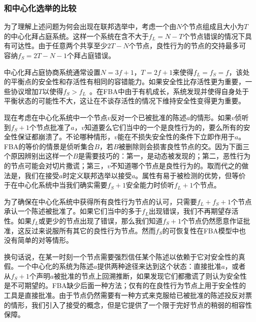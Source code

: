 \subsubsection{和中心化选举的比较}

为了理解上述问题为何会出现在联邦选举中，考虑一个由$N$个节点组成且{\quorum}大小为$T$的中心化拜占庭系统。这样一个系统在含不大于$f_L=N-T$个节点错误的情况下具有{\quorum}可达性。由于任意两个{\quorum}共享至少$2T-N$个节点，良性行为的节点的{\quorum}交持最多可容纳$f_S=2T-N-1$个拜占庭错误。

中心化拜占庭协商系统通常设置$N=3f+1$，$T=2f+1$来使得$f_L=f_S=f$，该处的平衡点的安全性和存活性有相同的容错能力。如果安全性比存活性更为重要，一些协议增加$T$以使得$f_S>f_L$~\cite{Li:2007:BOF:1973430.1973440}。在FBA中由于{\quorum}有机成长，系统发现并使得自身处于平衡状态的可能性不大，这让在不谈存活性的情况下维持安全性变得更为重要。

现在考虑在中心化系统中一个节点$v$反对一个已被批准的陈述$a$的情形。如果$v$侦听到$f_S+1$个节点批准了$a$，$v$知道要么它们当中的一个是良性行为的，要么所有的安全性保证都崩溃了。不论哪种情形，$v$能在不损失安全性的条件下立即作用于$a$。FBA的等价的情景是侦听集合$B$，若$B$被删除则会损害良性节点的{\quorum}交。因为下面三个原因辨别出这样一个$B$是需要技巧的：第一，{\quorum}是动态被发现的；第二，恶性行为的节点可能会对切片撒谎；第三，$v$不知道哪个节点是良性行为的。取而代之的做法是，我们在{\vblock}接受$a$时定义联邦选举以接受$a$。{\vblock}属性有易于被检测的优势，但等价于在中心化系统中当我们确实需要$f_S+1$安全能力时侦听$f_L+1$个节点。

为了确保在中心化系统中获得所有良性行为节点的认可，只需要$f_L+f_S+1$个节点承认一个陈述被批准了。如果它们当中的多于$f_L$出现错误，我们不再期望存活性。如果$f_L$或更少的节点出现了错误，那么我们知道$f_S+1$个节点仍然愿意作证批准，这反过来说服所有其它的良性行为节点。然而$f_S$的可恢复性在FBA模型中也没有简单的对等情形。

换句话说，在某一时刻一个节点需要强烈信任某个陈述以依赖于它对安全性的真假。一个中心化的系统为陈述$a$提供两种途径来达到这个状态：直接批准$a$，或者从$f_S+1$个声明$a$被批准的节点上回溯推断，如果发现它们都撒谎了则认为安全性是不可期望的。FBA缺少后面一种方法；仅有的在良性行为节点上用于安全性的工具是直接批准。由于节点仍然需要有一种方式来克服给已被批准的陈述投反对票的情形，我们引入了接受的概念，但是它提供了一个限于完好节点的稍弱的相容性保障。
